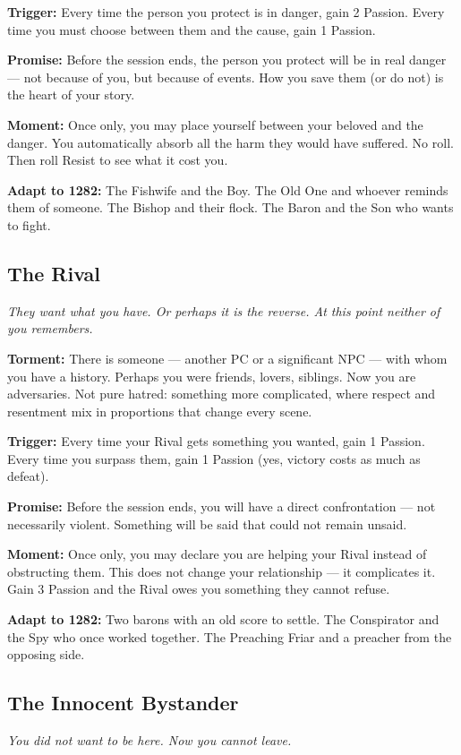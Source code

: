 \textbf{Trigger:} Every time the person you protect is in danger, gain
2 Passion. Every time you must choose between them and the cause, gain
1 Passion.

\textbf{Promise:} Before the session ends, the person you protect will
be in real danger --- not because of you, but because of events. How
you save them (or do not) is the heart of your story.

\textbf{Moment:} Once only, you may place yourself between your beloved
and the danger. You automatically absorb all the harm they would have
suffered. No roll. Then roll Resist to see what it cost you.

\textbf{Adapt to 1282:} The Fishwife and the Boy. The Old One and
whoever reminds them of someone. The Bishop and their flock.
The Baron and the Son who wants to fight.

\filetto

\subsection{The Rival}
\textit{They want what you have. Or perhaps it is the reverse. At this point neither of you remembers.}

\textbf{Torment:} There is someone --- another PC or a significant NPC
--- with whom you have a history. Perhaps you were friends, lovers,
siblings. Now you are adversaries. Not pure hatred: something more
complicated, where respect and resentment mix in proportions that change
every scene.

\textbf{Trigger:} Every time your Rival gets something you wanted,
gain 1 Passion. Every time you surpass them, gain 1 Passion (yes,
victory costs as much as defeat).

\textbf{Promise:} Before the session ends, you will have a direct
confrontation --- not necessarily violent. Something will be said
that could not remain unsaid.

\textbf{Moment:} Once only, you may declare you are helping your Rival
instead of obstructing them. This does not change your relationship ---
it complicates it. Gain 3 Passion and the Rival owes you something
they cannot refuse.

\textbf{Adapt to 1282:} Two barons with an old score to settle.
The Conspirator and the Spy who once worked together. The Preaching
Friar and a preacher from the opposing side.

\filetto

\subsection{The Innocent Bystander}
\textit{You did not want to be here. Now you cannot leave.}

